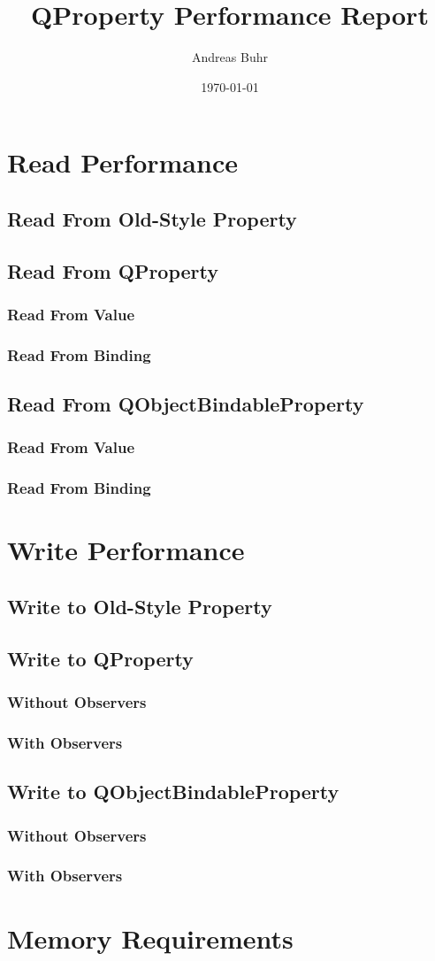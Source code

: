 \documentclass{article}
\title{QProperty Performance Report}
\author{Andreas Buhr}
\date{\today}
\begin{document}
\maketitle
\section{Read Performance}
\subsection{Read From Old-Style Property}
\subsection{Read From QProperty}
\subsubsection{Read From Value}
\subsubsection{Read From Binding}
\subsection{Read From QObjectBindableProperty}
\subsubsection{Read From Value}
\subsubsection{Read From Binding}
\section{Write Performance}
\subsection{Write to Old-Style Property}
\subsection{Write to QProperty}
\subsubsection{Without Observers}
\subsubsection{With Observers}
\subsection{Write to QObjectBindableProperty}
\subsubsection{Without Observers}
\subsubsection{With Observers}
\section{Memory Requirements}
\end{document}
